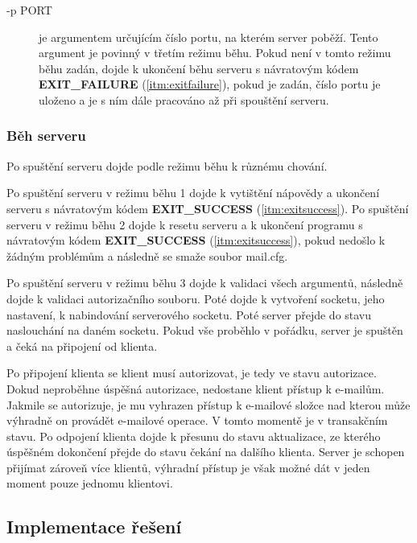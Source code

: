 \documentclass[11pt,a4paper]{report}
\begin{document}
\begin{description}
\item [-p PORT] je argumentem určujícím číslo portu, na kterém server poběží. Tento argument je povinný v třetím režimu běhu. Pokud není v tomto režimu běhu zadán, dojde k ukončení běhu serveru s návratovým kódem \textbf{EXIT\_FAILURE} (\ref{itm:exitfailure}), pokud je zadán, číslo portu je uloženo a je s ním dále pracováno až při spouštění serveru.
\end{description}
\subsubsection{Běh serveru}
Po spuštění serveru dojde podle režimu běhu k různému chování. \par
Po spuštění serveru v režimu běhu 1 dojde k vytištění nápovědy a ukončení serveru s návratovým kódem \textbf{EXIT\_SUCCESS} (\ref{itm:exitsuccess}).
Po spuštění serveru v režimu běhu 2 dojde k resetu serveru a k ukončení programu s návratovým kódem \textbf{EXIT\_SUCCESS} (\ref{itm:exitsuccess}), pokud nedošlo k žádným problémům a následně se smaže soubor mail.cfg.\par
Po spuštění serveru v režimu běhu 3 dojde k validaci všech argumentů, následně dojde k validaci autorizačního souboru. Poté dojde k vytvoření socketu, jeho nastavení, k nabindování serverového socketu. Poté server přejde do stavu naslouchání na daném socketu. Pokud vše proběhlo v pořádku, server je spuštěn a čeká na připojení od klienta.\par
Po připojení klienta se klient musí autorizovat, je tedy ve stavu autorizace. Dokud neproběhne úspěšná autorizace, nedostane klient přístup k e-mailům. Jakmile se autorizuje, je mu vyhrazen přístup k e-mailové složce nad kterou může výhradně on provádět e-mailové operace. V tomto momentě je v transakčním stavu. Po odpojení klienta dojde k přesunu do stavu aktualizace, ze kterého úspěšném dokončení přejde do stavu čekání na dalšího klienta. Server je schopen přijímat zároveň více klientů, výhradní přístup je však možné dát v jeden moment pouze jednomu klientovi.
\subsection{Implementace řešení}
\end{document}
